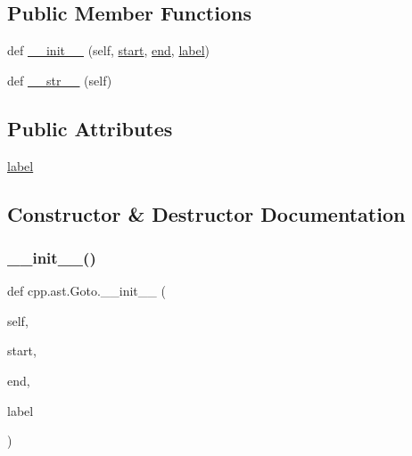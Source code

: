 \subsection*{Public Member Functions}
\begin{DoxyCompactItemize}
\item 
def \hyperlink{classcpp_1_1ast_1_1_goto_a928e79374a90d01fc060985ea1e45260}{\+\_\+\+\_\+init\+\_\+\+\_\+} (self, \hyperlink{classcpp_1_1ast_1_1_node_a7b2aa97e6a049bb1a93aea48c48f1f44}{start}, \hyperlink{classcpp_1_1ast_1_1_node_a3c5e5246ccf619df28eca02e29d69647}{end}, \hyperlink{classcpp_1_1ast_1_1_goto_a685284ea5f3b21f39aff7f5db841c8f5}{label})
\item 
def \hyperlink{classcpp_1_1ast_1_1_goto_a508b6bc091cf06bfed73a33368c236c9}{\+\_\+\+\_\+str\+\_\+\+\_\+} (self)
\end{DoxyCompactItemize}
\subsection*{Public Attributes}
\begin{DoxyCompactItemize}
\item 
\hyperlink{classcpp_1_1ast_1_1_goto_a685284ea5f3b21f39aff7f5db841c8f5}{label}
\end{DoxyCompactItemize}


\subsection{Constructor \& Destructor Documentation}
\mbox{\label{classcpp_1_1ast_1_1_goto_a928e79374a90d01fc060985ea1e45260}} 
\subsubsection{\texorpdfstring{\+\_\+\+\_\+init\+\_\+\+\_\+()}{\_\_init\_\_()}}
{\footnotesize\ttfamily def cpp.\+ast.\+Goto.\+\_\+\+\_\+init\+\_\+\+\_\+ (\begin{DoxyParamCaption}\item[{}]{self,  }\item[{}]{start,  }\item[{}]{end,  }\item[{}]{label }\end{DoxyParamCaption})}



